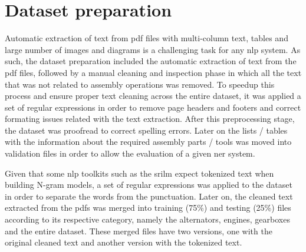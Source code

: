 \section{Dataset preparation}\label{sec:dataset-preparation}

Automatic extraction of text from \gls{pdf} files with multi-column text, tables and large number of images and diagrams is a challenging task for any \gls{nlp} system. As such, the dataset preparation included the automatic extraction of text from the \gls{pdf} files, followed by a manual cleaning and inspection phase in which all the text that was not related to assembly operations was removed. To speedup this process and ensure proper text cleaning across the entire dataset, it was applied a set of regular expressions in order to remove page headers and footers and correct formating issues related with the text extraction. After this preprocessing stage, the dataset was proofread to correct spelling errors. Later on the lists / tables with the information about the required assembly parts / tools was moved into validation files in order to allow the evaluation of a given \gls{ner} system.

Given that some \gls{nlp} toolkits such as the \gls{srilm} \cite{Stolcke2002} expect tokenized text when building N-gram models, a set of regular expressions was applied to the dataset in order to separate the words from the punctuation. Later on, the cleaned text extracted from the \glspl{pdf} was merged into training (75\%) and testing (25\%) files according to its respective category, namely the alternators, engines, gearboxes and the entire dataset. These merged files have two versions, one with the original cleaned text and another version with the tokenized text.

